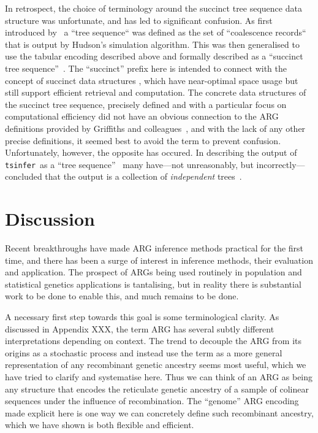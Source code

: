 \documentclass{article}
\newcommand{\tsinfer}[0]{\texttt{tsinfer}}
\begin{document}
In retrospect, the choice of terminology around the succinct
tree sequence data structure was unfortunate, and has led to
significant confusion. As first introduced by~\cite{kelleher2016efficient}
a ``tree sequence`` was defined as the set of ``coalescence records``
that is output by Hudson's simulation algorithm.
This was then generalised to use the
tabular encoding described above and formally described as a ``succinct
tree sequence''~\citep{kelleher2018efficient}.
The ``succinct'' prefix here is intended to connect
with the concept of succinct data structures
\citep[e.g.][]{gog2014theory},
which have near-optimal
space usage but still support efficient retrieval and computation.
The concrete data structures of the succinct tree sequence, precisely
defined and with a particular focus on computational efficiency
did not have an obvious connection to the ARG definitions
provided by Griffiths and
colleagues~\citep{griffiths1991two,ethier1990two,
griffiths1996ancestral,griffiths1997ancestral}, and with the lack
of any other precise definitions, it seemed best to avoid the
term to prevent confusion. Unfortunately, however, the opposite
has occured. In describing the output of \tsinfer\ as a ``tree
sequence''~\citep{kelleher2019inferring} many
have---not unreasonably, but incorrectly---concluded that the
output is a collection of \emph{independent}
trees~\citep[e.g.,][]{hejase2020summary,ignatieva2021kwarg}.

\section*{Discussion}
Recent breakthroughs have made ARG inference methods practical
for the first time, and there has been a surge of interest
in inference methods, their evaluation and application.
The prospect of ARGs being used routinely in population
and statistical genetics applications is tantalising,
but in reality there is  substantial work to be done to
enable this, and much remains to be done.

A necessary first step towards this goal is some terminological
clarity. As discussed in Appendix XXX, the term ARG has several
subtly different interpretations depending on context. The
trend to decouple the ARG from its origins as a stochastic
process and instead use the term as a more general representation of any
recombinant genetic ancestry seems most useful, which we have
tried to clarify and systematise here. Thus
we can think of an ARG as being any structure that encodes the
reticulate genetic ancestry of a sample of colinear sequences under
the influence of recombination. The ``genome'' ARG encoding
made explicit here is one way we can concretely
define such recombinant ancestry, which we have shown is both
flexible and efficient.
\end{document}
